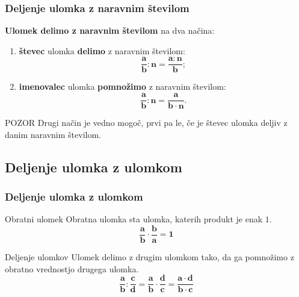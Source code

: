         \begin{frame}[t]
            \frametitle{Deljenje ulomka z naravnim številom}

            \begin{alertblock}{}
                \textbf{Ulomek delimo z naravnim številom} na dva načina:
                \begin{enumerate}
                    \item \textbf{števec} ulomka \textbf{delimo} z naravnim številom: $$\mathbf{\frac{a}{b}:n=\frac{a:n}{b}};$$
                    \item \textbf{imenovalec} ulomka \textbf{pomnožimo} z naravnim številom: $$\mathbf{\frac{a}{b}:n=\frac{a}{b\cdot n}}.$$
                \end{enumerate}
            \end{alertblock}                
            
            \begin{exampleblock}{POZOR}
                Drugi način je vedno mogoč, prvi pa le, če je števec ulomka deljiv z danim naravnim številom.
            \end{exampleblock}
        \end{frame}

    \subsection{Deljenje ulomka z ulomkom}

        \begin{frame}[t]
            \frametitle{Deljenje ulomka z ulomkom}

            \begin{alertblock}{Obratni ulomek}
                Obratna ulomka sta ulomka, katerih produkt je enak $1$.
                $$ \mathbf{\frac{a}{b}\cdot\frac{b}{a}=1} $$
            \end{alertblock}

            \begin{alertblock}{Deljenje ulomkov}
                Ulomek delimo z drugim ulomkom tako, da ga pomnožimo z obratno vrednostjo drugega ulomka.
                $$ \mathbf{\frac{a}{b}:\frac{c}{d}=\frac{a}{b}\cdot\frac{d}{c}=\frac{a\cdot d}{b\cdot c}} $$
            \end{alertblock}       

        \end{frame}



